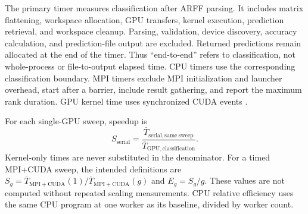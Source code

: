 \documentclass[conference]{IEEEtran}
\begin{document}
The primary timer measures classification after ARFF parsing. It includes matrix flattening, workspace allocation, GPU transfers, kernel execution, prediction retrieval, and workspace cleanup. Parsing, validation, device discovery, accuracy calculation, and prediction-file output are excluded. Returned predictions remain allocated at the end of the timer. Thus ``end-to-end'' refers to classification, not whole-process or file-to-output elapsed time. CPU timers use the corresponding classification boundary. MPI timers exclude MPI initialization and launcher overhead, start after a barrier, include result gathering, and report the maximum rank duration. GPU kernel time uses synchronized CUDA events \cite{cuda9}.

For each single-GPU sweep, speedup is
\begin{equation}
S_{\mathrm{serial}}=\frac{\overline{T}_{\mathrm{serial,same\ sweep}}}{\overline{T}_{\mathrm{GPU,classification}}}.
\end{equation}
Kernel-only times are never substituted in the denominator. For a timed MPI+CUDA sweep, the intended definitions are $S_g=\overline{T}_{\mathrm{MPI+CUDA}}(1)/\overline{T}_{\mathrm{MPI+CUDA}}(g)$ and $E_g=S_g/g$. These values are not computed without repeated scaling measurements. CPU relative efficiency uses the same CPU program at one worker as its baseline, divided by worker count.
\end{document}
